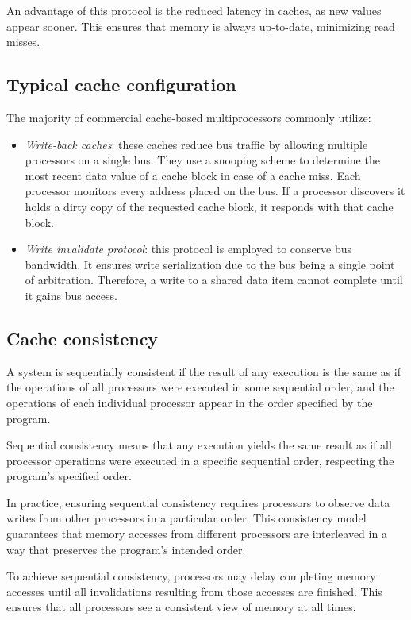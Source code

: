 An advantage of this protocol is the reduced latency in caches, as new values appear sooner. 
This ensures that memory is always up-to-date, minimizing read misses.

\subsection{Typical cache configuration}
The majority of commercial cache-based multiprocessors commonly utilize:
\begin{itemize}
    \item \textit{Write-back caches}: these caches reduce bus traffic by allowing multiple processors on a single bus. 
        They use a snooping scheme to determine the most recent data value of a cache block in case of a cache miss. 
        Each processor monitors every address placed on the bus. 
        If a processor discovers it holds a dirty copy of the requested cache block, it responds with that cache block.
    \item \textit{Write invalidate protocol}: this protocol is employed to conserve bus bandwidth. 
        It ensures write serialization due to the bus being a single point of arbitration. 
        Therefore, a write to a shared data item cannot complete until it gains bus access.
\end{itemize}

\subsection{Cache consistency}
\begin{definition}
    A system is sequentially consistent if the result of any execution is the same as if the operations of all processors were executed in some sequential order, and the operations of each individual processor appear in the order specified by the program.
\end{definition}
Sequential consistency means that any execution yields the same result as if all processor operations were executed in a specific sequential order, respecting the program's specified order.

In practice, ensuring sequential consistency requires processors to observe data writes from other processors in a particular order. 
This consistency model guarantees that memory accesses from different processors are interleaved in a way that preserves the program's intended order.

To achieve sequential consistency, processors may delay completing memory accesses until all invalidations resulting from those accesses are finished. 
This ensures that all processors see a consistent view of memory at all times.

